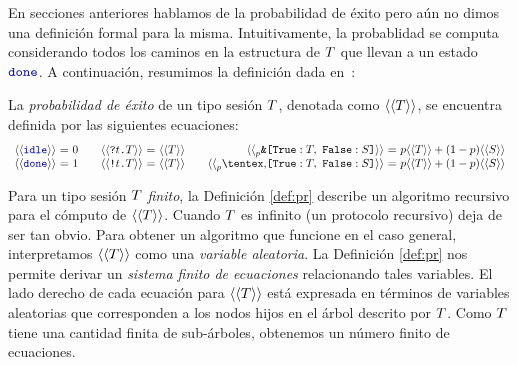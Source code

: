 En secciones anteriores hablamos de la probabilidad de éxito pero aún no dimos
una definición formal para la misma. Intuitivamente, la probablidad se computa
considerando todos los caminos en la estructura de $T$ que llevan a
un estado $\Done$. A continuación, resumimos la definición dada
en~\cite{DBLP:conf/concur/InversoMPTT20}:

\begin{definition}
  \label{def:pr}
	La \emph{probabilidad de éxito} de un tipo sesión $T$,
	denotada como $\langle\langle T\rangle\rangle$, se encuentra definida por
	las siguientes ecuaciones:
  \[
    \begin{array}{r@{~}c@{~}l}
      \psfun\Idle & = & 0 \\
      \psfun\Done & = & 1 \\
    \end{array}
    \quad
    \begin{array}{r@{~}c@{~}l}
      \psfun{\In\Type\SessionType} & = & \psfun\SessionType \\
      \psfun{\Out\Type\SessionType} & = & \psfun\SessionType \\
    \end{array}
    \quad
    \begin{array}{r@{~}c@{~}l}
      \psfun{\BinaryPBranch\SessionTypeT\SessionTypeS} & = & p\psfun\SessionTypeT + (1-p)\psfun\SessionTypeS \\
      \psfun{\BinaryPChoice\SessionTypeT\SessionTypeS} & = & p\psfun\SessionTypeT + (1-p)\psfun\SessionTypeS \\
    \end{array}
  \]
\end{definition}

Para un tipo sesión $T$ \emph{finito}, la Definición \ref{def:pr}
describe un algoritmo recursivo para el cómputo de $\langle\langle T\rangle\rangle$. Cuando
$T$ es infinito (un protocolo recursivo) deja de ser tan obvio. Para
obtener un algoritmo que funcione en el caso general, interpretamos
$\langle\langle T\rangle\rangle$ como una \emph{variable aleatoria}. La Definición
\ref{def:pr} nos permite derivar un \emph{sistema finito de ecuaciones}
relacionando tales variables. El lado derecho de cada ecuación para
$\langle\langle T\rangle\rangle$ está expresada en términos de variables aleatorias que
corresponden a los nodos hijos en el árbol descrito por $T$. Como
$T$ tiene una cantidad finita de sub-árboles, obtenemos un número
finito de ecuaciones.

